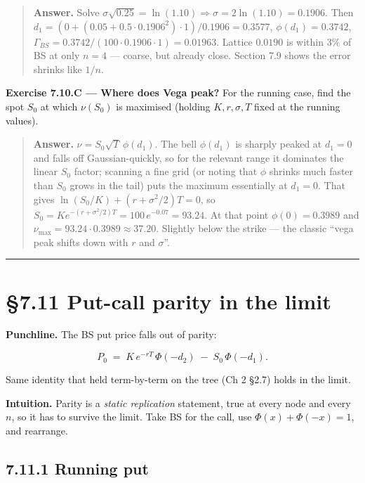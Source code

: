 \documentclass[
  10pt,
  twoside]{book}
\begin{document}
\begin{quote}
\textbf{Answer.} Solve
\(\sigma\sqrt{0.25}=\ln(1.10)\Rightarrow \sigma=2\ln(1.10)=0.1906\).
Then \(d_1=(0+(0.05+0.5\cdot 0.1906^2)\cdot 1)/0.1906=0.3577\),
\(\phi(d_1)=0.3742\),
\(\Gamma_{BS}=0.3742/(100\cdot 0.1906\cdot 1)=\mathbf{0.01963}\).
Lattice \(0.0190\) is within \(3\%\) of BS at only \(n=4\) --- coarse,
but already close. Section 7.9 shows the error shrinks like \(1/n\).
\end{quote}

\textbf{Exercise 7.10.C --- Where does Vega peak?} For the running case,
find the spot \(S_0\) at which \(\nu(S_0)\) is maximised (holding
\(K, r, \sigma, T\) fixed at the running values).

\begin{quote}
\textbf{Answer.} \(\nu=S_0\sqrt T\,\phi(d_1)\). The bell \(\phi(d_1)\)
is sharply peaked at \(d_1=0\) and falls off Gaussian-quickly, so for
the relevant range it dominates the linear \(S_0\) factor; scanning a
fine grid (or noting that \(\phi\) shrinks much faster than \(S_0\)
grows in the tail) puts the maximum essentially at \(d_1=0\). That gives
\(\ln(S_0/K)+(r+\sigma^2/2)T=0\), so
\(S_0=Ke^{-(r+\sigma^2/2)T}=100\,e^{-0.07}=\mathbf{93.24}\). At that
point \(\phi(0)=0.3989\) and
\(\nu_{\max}=93.24\cdot 0.3989\approx 37.20\). Slightly below the strike
--- the classic ``vega peak shifts down with \(r\) and \(\sigma\)''.
\end{quote}

\begin{center}\rule{0.5\linewidth}{0.5pt}\end{center}

\section{§7.11 Put-call parity in the
limit}\label{put-call-parity-in-the-limit}

\textbf{Punchline.} The BS put price falls out of parity:

\[\boxed{\;\; P_0 \;=\; K\,e^{-rT}\,\Phi(-d_2) \;-\; S_0\,\Phi(-d_1). \;\;}\]

Same identity that held term-by-term on the tree (Ch 2 §2.7) holds in
the limit.

\textbf{Intuition.} Parity is a \emph{static replication} statement,
true at every node and every \(n\), so it has to survive the limit. Take
BS for the call, use \(\Phi(x) + \Phi(-x) = 1\), and rearrange.

\subsection{7.11.1 Running put}\label{running-put}
\end{document}
